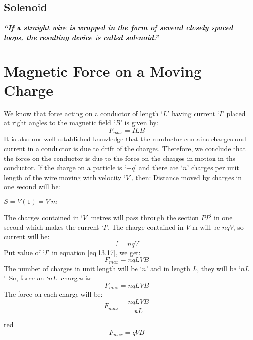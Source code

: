 \subsection*{Solenoid}
 \textit{\textbf{“If a straight wire is wrapped in the form of several closely spaced loops, the resulting device is called solenoid.”}}
 
 \section{Magnetic Force on a Moving Charge}
 We know that force acting on a conductor of length ‘$L$’ having current ‘$I$’ placed at right angles to the magnetic field ‘$B$’ is given by:
\begin{equation}\label{eq:13.17}
     F_{max} = ILB
\end{equation}
It is also our well-established knowledge that the conductor contains charges and current in a conductor is due to drift of the charges. Therefore, we conclude that the force on the conductor is due to the force on the charges in motion in the conductor.
If the charge on a particle is ‘$+q$’ and there are ‘$n$’ charges per unit length of the wire moving with velocity ‘$V$', then:
\newline
Distance moved by charges in one second will be:
\begin{center}
$S= V(1) = V\:m$
\end{center}
The charges contained in ‘$V$’ metres will pass through the section $PP^{\prime}$ in one second which makes the current ‘$I$’. The charge contained in $V$ m will be $nqV$, so current will be:
 \begin{equation}\label{eq:13.18}
    I = nqV
\end{equation}
Put value of `$I$' in equation \ref{eq:13.17}, we get:
\begin{equation}\nonumber
    F_{max} = nqLVB
\end{equation}
 The number of charges in unit length will be `$n$' and in length $L$, they will be `$nL$'. So, force on ‘$nL$’ charges is:
\begin{equation}\nonumber
     F_{max} = nqLVB
\end{equation}
 The force on each charge will be:
\begin{equation}\nonumber
     F_{max}=\frac{nqLVB}{nL}
\end{equation}
\begin{mybox}{red}{}
\begin{equation}\label{eq:13.19}
     F_{max} = qVB
\end{equation}
\end{mybox}
